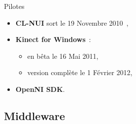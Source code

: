 \begin{frame}{Pilotes}
{\begin{itemize}
    \item<3-> \textbf{CL-NUI} sort le 19 Novembre 2010~\cite{clnui},
    \item<4-> \textbf{Kinect for Windows}~:
  {
    \begin{itemize}
      \item en bêta le 16 Mai 2011,
      \item version complète le 1 Février 2012,
    \end{itemize}
  }
  \item<5-> \textbf{OpenNI SDK}.
  \end{itemize}
\vfill
}
\end{frame}

\subsection{Middleware}
